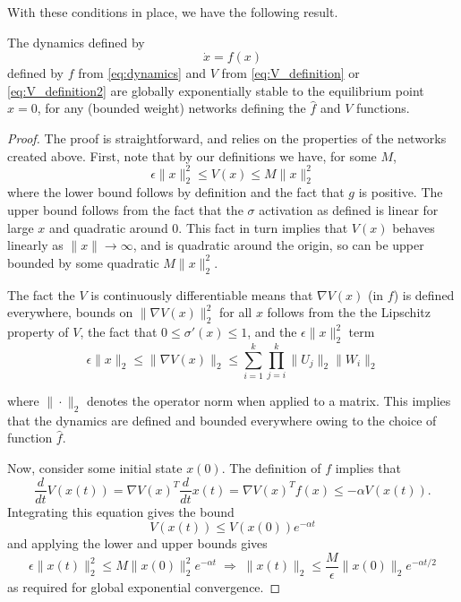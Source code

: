 With these conditions in place, we have the following result.
\begin{theorem}
    The dynamics defined by
    \begin{equation}
        \dot{x} = f(x)
    \end{equation}
    defined by $f$ from \eqref{eq:dynamics} and $V$ from \eqref{eq:V_definition} or \eqref{eq:V_definition2} are globally exponentially stable to the equilibrium point $x=0$, for any (bounded weight) networks defining the $\hat{f}$ and $V$ functions.
\end{theorem}
\begin{proof}
    The proof is straightforward, and relies on the properties of the networks created above.  First, note that by our definitions we have, for some $M$,
    \begin{equation}
        \epsilon \|x\|^2_2 \leq V(x) \leq M \|x\|_2^2
    \end{equation}
    where the lower bound follows by definition and the fact that $g$ is positive. The upper bound follows from the fact that the $\sigma$ activation as defined is linear for large $x$ and quadratic around 0.  This fact in turn implies that $V(x)$ behaves linearly as $\|x\|\rightarrow \infty$, and is quadratic around the origin, so can be upper bounded by some quadratic $M \|x\|_2^2$.

    The fact the $V$ is continuously differentiable means that $\nabla V(x)$ (in $f$) is defined everywhere, bounds on $\|\nabla V(x)\|_2^2$ for all $x$ follows from the the Lipschitz property of $V$, the fact that $0 \leq \sigma'(x) \leq 1$, and the $\epsilon \|x\|_2^2$ term
    \begin{equation}
        \epsilon \|x\|_2 \leq  \|\nabla V(x)\|_2 \leq \sum_{i=1}^k \prod_{j=i}^k \|U_j\|_2 \|W_i\|_2
    \end{equation}

    where $\|\cdot\|_2$ denotes the operator norm when applied to a matrix.  This implies that the dynamics are defined and bounded everywhere owing to the choice of function $\hat{f}$.

    Now, consider some initial state $x(0)$.  The definition of $f$ implies that
    \begin{equation}
        \frac{d}{dt} V(x(t)) = \nabla V(x)^T \frac{d}{dt} x(t) = \nabla V(x)^T f(x) \leq -\alpha V(x(t)).
    \end{equation}
    Integrating this equation gives the bound
    \begin{equation}
        V(x(t)) \leq V(x(0))e^{-\alpha t}
    \end{equation}
    and applying the lower and upper bounds gives
    \begin{equation}
        \epsilon \|x(t)\|_2^2 \leq M \|x(0)\|_2^2 e^{-\alpha t}
        \; \Longrightarrow \; \|x(t)\|_2 \leq \frac{M}{\epsilon} \|x(0)\|_2 e^{-\alpha t/2}
    \end{equation}
    as required for global exponential convergence.
\end{proof}




